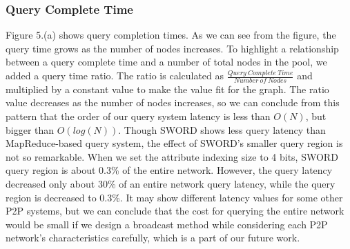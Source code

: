 \documentclass{acm_proc_article-sp}
\begin{document}
\subsubsection{Query Complete Time}
Figure 5.(a) shows query completion times. As we can see from the figure, the query time grows as the number of nodes increases. To highlight a relationship between a query complete time and a number of total nodes in the pool,
we added a query time ratio. The ratio is calculated as \begin{math}\frac{Query\ Complete\ Time}{Number\ of\ Nodes}\end{math} and multiplied by a constant value to make the value fit for the graph.
The ratio value decreases as the number of nodes increases, so we can conclude from this pattern that the order of our query system latency is less than $O(N)$, but bigger than $O(log(N))$.
Though SWORD shows less query latency than MapReduce-based query system, the effect of SWORD's smaller query region is not so remarkable. 
When we set the attribute indexing size to 4 bits, SWORD query region is about 0.3\% of the entire network. 
However, the query latency decreased only about 30\% of an entire network query latency, while the query region is decreased to 0.3\%.
It may show different latency values for some other P2P systems, but we can conclude that the cost for querying the entire network would be small if we design a broadcast method while considering
each P2P network's characteristics carefully, which is a part of our future work.
\end{document}
